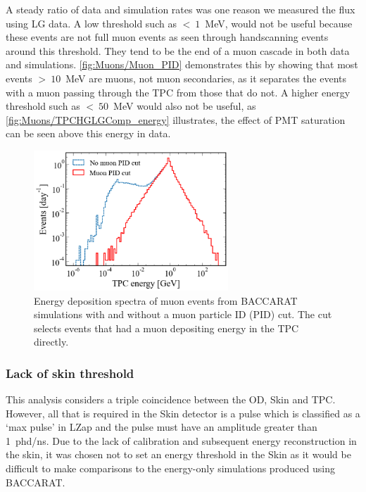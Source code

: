 A steady ratio of data and simulation rates was one reason we measured the flux using LG data. A low threshold such as $<~1$~MeV, would not be useful because these events are not full muon events as seen through handscanning events around this threshold. They tend to be the end of a muon cascade in both data and simulations. \autoref{fig:Muons/Muon_PID} demonstrates this by showing that most events $>~10$~MeV are muons, not muon secondaries, as it separates the events with a muon passing through the TPC from those that do not. A higher energy threshold such as $<~50$~MeV would also not be useful, as \autoref{fig:Muons/TPCHGLGComp_energy} illustrates, the effect of PMT saturation can be seen above this energy in data.
\begin{figure}[htbp]
    \centering
    \includegraphics[width=0.65\textwidth]{figures/Muons/Muon_pid_cutLZstyle.pdf}
    \caption{Energy deposition spectra of muon events from BACCARAT simulations with and without a muon particle ID (PID) cut. The cut selects events that had a muon depositing energy in the TPC directly.}
    \label{fig:Muons/Muon_PID}
\end{figure}

\subsubsection{Lack of skin threshold}\label{sec:Muons/MuonFluxSkinThreshold}
This analysis considers a triple coincidence between the OD, Skin and TPC. However, all that is required in the Skin detector is a pulse which is classified as a `max pulse' in LZap and the pulse must have an amplitude greater than 1~phd/ns. Due to the lack of calibration and subsequent energy reconstruction in the skin, it was chosen not to set an energy threshold in the Skin as it would be difficult to make comparisons to the energy-only simulations produced using BACCARAT.

